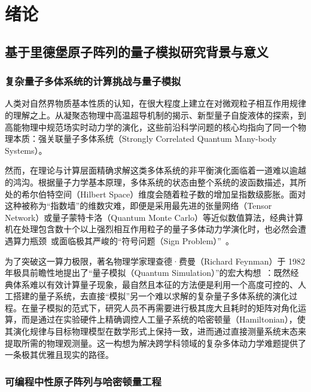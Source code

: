 \documentclass[../main.tex]{subfiles}
\begin{document}
\chapter{绪论}
\label{ch1:sec:intro}

\section{基于里德堡原子阵列的量子模拟研究背景与意义}
\label{ch1:sec:background}

\subsection{复杂量子多体系统的计算挑战与量子模拟}
\label{ch1:subsec:challenge}

人类对自然界物质基本性质的认知，在很大程度上建立在对微观粒子相互作用规律的理解之上。从凝聚态物理中高温超导机制的揭示、新型量子自旋液体的探索，到高能物理中规范场实时动力学的演化，这些前沿科学问题的核心均指向了同一个物理本质：强关联量子多体系统（Strongly Correlated Quantum Many-body Systems）。

然而，在理论与计算层面精确求解这类多体系统的非平衡演化面临着一道难以逾越的鸿沟。根据量子力学基本原理，多体系统的状态由整个系统的波函数描述，其所处的希尔伯特空间（Hilbert Space）维度会随着粒子数的增加呈指数级膨胀。面对这种被称为“指数墙”的维数灾难，即便是采用最先进的张量网络（Tensor Network）或量子蒙特卡洛（Quantum Monte Carlo）等近似数值算法，经典计算机在处理包含数十个以上强烈相互作用粒子的量子多体动力学演化时，也必然会遭遇算力瓶颈~\cite{eisert2010colloquium, cirac2021matrix}或面临极其严峻的“符号问题（Sign Problem）”~\cite{troyer2005computational, georgescu2014quantum}。


为了突破这一算力极限，著名物理学家理查德·费曼（Richard Feynman）于 1982 年极具前瞻性地提出了“量子模拟（Quantum Simulation）”的宏大构想~\cite{feynman2018simulating}：既然经典体系难以有效计算量子现象，最自然且本征的方法便是利用一个高度可控的、人工搭建的量子系统，去直接“模拟”另一个难以求解的复杂量子多体系统的演化过程。在量子模拟的范式下，研究人员不再需要进行极其庞大且耗时的矩阵对角化运算，而是通过在实验硬件上精确调控人工量子系统的哈密顿量（Hamiltonian），使其演化规律与目标物理模型在数学形式上保持一致，进而通过直接测量系统末态来提取所需的物理观测量。这一构想为解决跨学科领域的复杂多体动力学难题提供了一条极其优雅且现实的路径。

\subsection{可编程中性原子阵列与哈密顿量工程}
\label{ch1:subsec:platform}
\end{document}
